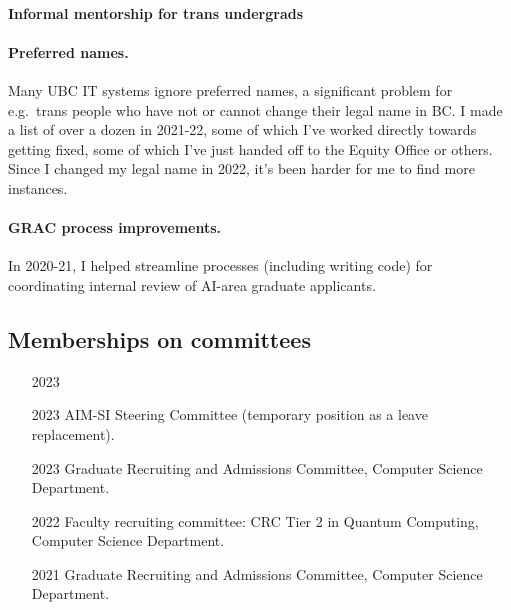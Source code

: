 \documentclass[10pt]{article}
\begin{document}


\paragraph{Informal mentorship for trans undergrads}

\paragraph{Preferred names.}
{%
Many UBC IT systems ignore preferred names,
a significant problem for e.g.\ trans people who have not or cannot change their legal name in BC.
I made a list of over a dozen in 2021-22,
some of which I've worked directly towards getting fixed,
some of which I've just handed off to the Equity Office or others.
Since I changed my legal name in 2022, it's been harder for me to find more instances.
}

\paragraph{GRAC process improvements.}
In 2020-21, I helped streamline processes (including writing code) for coordinating internal review of AI-area graduate applicants.


\subsection{Memberships on committees} %

\begin{itemize}[leftmargin=5em]
  \item[2023] 
  \item[2023] AIM-SI Steering Committee (temporary position as a leave replacement).
  \item[2023] Graduate Recruiting and Admissions Committee, Computer Science Department.
  \item[2022] Faculty recruiting committee: CRC Tier 2 in Quantum Computing, Computer Science Department.
  \item[2021] Graduate Recruiting and Admissions Committee, Computer Science Department.
\end{itemize}
\end{document}

